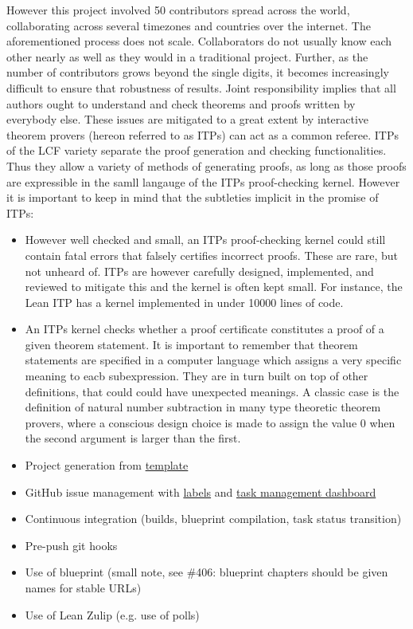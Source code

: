 However this project involved 50 contributors spread across the world, collaborating across several timezones and countries over the internet. The aforementioned process does not scale. Collaborators do not usually know each other nearly as well as they would in a traditional project. Further, as the number of contributors grows beyond the single digits, it becomes increasingly difficult to ensure that robustness of results. Joint responsibility implies that all authors ought to understand and check theorems and proofs written by everybody else. These issues are mitigated to a great extent by interactive theorem provers (hereon referred to as ITPs) can act as a common referee. ITPs of the LCF variety separate the proof generation and checking functionalities. Thus they allow a variety of methods of generating proofs, as long as those proofs are expressible in the samll langauge of the ITPs proof-checking kernel. However it is important to keep in mind that the subtleties implicit in the promise of ITPs:
\begin{itemize}
    \item However well checked and small, an ITPs proof-checking kernel could still contain fatal errors that falsely certifies incorrect proofs. These are rare, but not unheard of. ITPs are however carefully designed, implemented, and reviewed to mitigate this and the kernel is often kept small. For instance, the Lean ITP has a kernel implemented in under 10000 lines of code. 
    \item An ITPs kernel checks whether a proof certificate constitutes a proof of a given theorem statement. It is important to remember that theorem statements are specified in a computer language which assigns a very specific meaning to eacb subexpression. They are in turn built on top of other definitions, that could could have unexpected meanings. A classic case is the definition of natural number subtraction in many type theoretic theorem provers, where a conscious design choice is made to assign the value 0 when the second argument is larger than the first.
\end{itemize}
\begin{itemize}
    \item Project generation from \href{https://github.com/pitmonticone/LeanProject}{template}
    \item GitHub issue management with \href{https://github.com/teorth/equational_theories/labels}{labels} and \href{https://github.com/users/teorth/projects/1}{task management dashboard}
    \item Continuous integration (builds, blueprint compilation, task status transition)
    \item Pre-push git hooks
    \item Use of blueprint (small note, see \#406: blueprint chapters should be given names for stable URLs)
    \item Use of Lean Zulip (e.g. use of polls)
\end{itemize}

